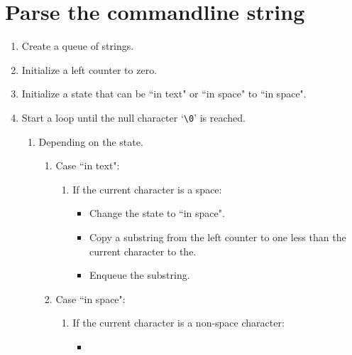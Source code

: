 \documentclass{article}
\begin{document}
\section{Parse the commandline string}
\begin{enumerate}
    \item
        Create a queue of strings.
    \item
        Initialize a left counter to zero.
    \item
        Initialize a state that can be ``in text" or ``in space" to ``in space".
    \item
        Start a loop until the null character `\texttt{\textbackslash0}' is reached.
        \begin{enumerate}
            \item
                Depending on the state.
                \begin{enumerate}
                    \item
                        Case ``in text":
                            \begin{enumerate}
                                \item
                                    If the current character is a space:
                                    \begin{itemize}
                                        \item
                                            Change the state to ``in space".
                                        \item
                                            Copy a substring from the left counter to one less than the current character to the.
                                        \item
                                            Enqueue the substring.
                                    \end{itemize}
                            \end{enumerate}
                    \item
                        Case ``in space":
                            \begin{enumerate}
                                \item
                                    If the current character is a non-space character:
                                        \begin{itemize}
                                            \item

\end{itemize}
\end{enumerate}
\end{enumerate}
\end{enumerate}
\end{enumerate}
\end{document}
